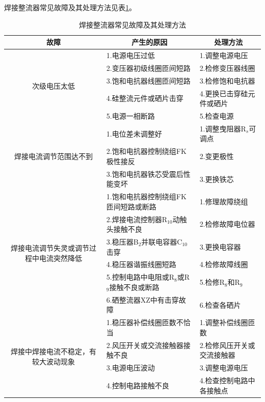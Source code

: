 \documentclass{ctexbook}
\begin{document}
焊接整流器常见故障及其处理方法见表\ref{tab:hanjiezhengliuqiguzhang}。
\begin{table}[htbp]
	\centering
	\caption{焊接整流器常见故障及其处理方法}
    \begin{tabular}{c|l|l}
	\toprule
	故障    & \multicolumn{1}{c|}{产生的原因} & \multicolumn{1}{c}{处理方法} \\
	\midrule
	\multirow{5}[10]{*}{次级电压太低} & 1.电源电压过低 & 1.调整电源电压 \\
	\cmidrule{2-3}          & 2.变压器初级线圈匝间短路 & 2.检修变压器线圈 \\
	\cmidrule{2-3}          & 3.饱和电抗器线圈匝间短路 & 3.检修饱和电抗器 \\
	\cmidrule{2-3}          & 4.硅整流元件或硒片击穿 & 4.更换已击穿硅元件或硒片 \\
	\cmidrule{2-3}          & 5.电源一相断路 & 5.检查电源 \\
	\midrule
	\multirow{3}[6]{*}{焊接电流调节范围达不到} & 1.电位差未调整好 & 1.调整曳阻器R$_s$可调点 \\
	\cmidrule{2-3}          & 2.饱和电抗器控制绕组FK极性接反 & 2.变更极性 \\
	\cmidrule{2-3}          & 3.饱和电抗器铁芯受震后性能变坏 & 3.更换铁芯 \\
	\midrule
	\multirow{6}[12]{*}{焊接电流调节失灵或调节过程中电流突然降低} & 1.饱和电抗器控制绕组FK匝间短路或断路 & 1.修理故障绕组 \\
	\cmidrule{2-3}          & 2.焊接电流控制器R$_{10}$动触头接触不良 & 2.检修故障电位器 \\
	\cmidrule{2-3}          & 3.稳压器B$_2$并联电容器C$_{10}$击穿 & 3.更换电容器 \\
	\cmidrule{2-3}          & 4.稳压器谐振线圈短路 & 4.检修故障线圈 \\
	\cmidrule{2-3}          & 5.控制电路中电阻或R$_8$或R$_9$接触不良或断路 & 5.检修R$_8$和R$_9$ \\
	\cmidrule{2-3}          & 6.硒整流器XZ中有击穿故障 & 6.检查各硒片 \\
	\midrule
	\multirow{4}[8]{*}{焊接中焊接电流不稳定，有较大波动现象} & 1.稳压器补偿线圈匝数不恰当 & 1.调整补偿线圈匝数 \\
	\cmidrule{2-3}          & 2.风压开关或交流接触器接触不良 & 2.检修风压开关或交流接触器 \\
	\cmidrule{2-3}          & 3.电源电压波动 & 3.调整电源电压 \\
	\cmidrule{2-3}          & 4.控制电路接触不良 & 4.检查控制电路中各接触点 \\
	\bottomrule
\end{tabular}%
	\label{tab:hanjiezhengliuqiguzhang}%
\end{table}%
\end{document}

